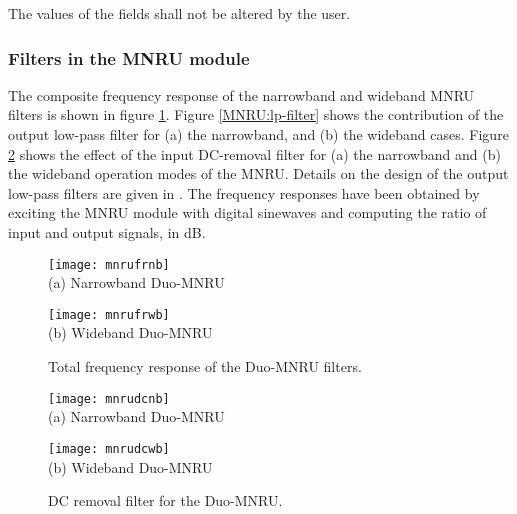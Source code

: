The values of the fields shall not be altered by the user.


\subsubsection{Filters in the MNRU module}

The composite frequency response of the narrowband and wideband MNRU
filters is shown in figure \ref{MNRU:both-filters}. Figure
\ref{MNRU:lp-filter} shows the contribution of the output low-pass
filter for (a) the narrowband, and (b) the wideband cases. Figure
\ref{MNRU:hp-filter} shows the effect of the input DC-removal filter
for (a) the narrowband and (b) the wideband operation modes of the
MNRU. Details on the design of the output low-pass filters are given
in \cite{Duo-MNRU}. The frequency responses have been obtained by
exciting the MNRU module with digital sinewaves and computing the
ratio of input and output signals, in dB.


\begin{figure}[p]
  \begin{center}
    \texttt{[image: mnrufrnb]}
    \\
    (a) Narrowband Duo-MNRU

    \texttt{[image: mnrufrwb]}
    \\
    (b) Wideband Duo-MNRU
  \end{center}
  \caption{ Total frequency response of the Duo-MNRU filters.
            \label{MNRU:both-filters}
          }
\end{figure}

\begin{figure}[p]
  \begin{center}
    \texttt{[image: mnrudcnb]}
    \\
    (a) Narrowband Duo-MNRU

    \texttt{[image: mnrudcwb]}
    \\
    (b) Wideband Duo-MNRU
  \end{center}
  \caption{ DC removal filter for the Duo-MNRU. \label{MNRU:hp-filter} }
\end{figure}

